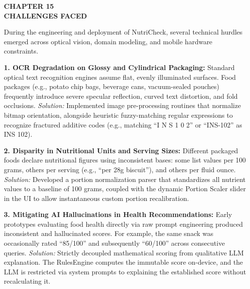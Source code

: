\documentclass[12pt]{article}
\begin{document}
\newpage

\begin{center}
\textbf{\Large CHAPTER 15}\\[0.5cm]
\textbf{\Large CHALLENGES FACED}\\[1cm]
\end{center}

\noindent
During the engineering and deployment of NutriCheck, several technical hurdles emerged across optical vision, domain modeling, and mobile hardware constraints.

\vspace{0.3cm}

\noindent
\textbf{1. OCR Degradation on Glossy and Cylindrical Packaging:}
Standard optical text recognition engines assume flat, evenly illuminated surfaces. Food packages (e.g., potato chip bags, beverage cans, vacuum-sealed pouches) frequently introduce severe specular reflection, curved text distortion, and fold occlusions.
\textit{Solution:} Implemented image pre-processing routines that normalize bitmap orientation, alongside heuristic fuzzy-matching regular expressions to recognize fractured additive codes (e.g., matching ``I N S 1 0 2'' or ``INS-102'' as INS 102).

\vspace{0.3cm}

\noindent
\textbf{2. Disparity in Nutritional Units and Serving Sizes:}
Different packaged foods declare nutritional figures using inconsistent bases: some list values per 100 grams, others per serving (e.g., ``per 28g biscuit''), and others per fluid ounce.
\textit{Solution:} Developed a portion normalization parser that standardizes all nutrient values to a baseline of 100 grams, coupled with the dynamic Portion Scaler slider in the UI to allow instantaneous custom portion recalibration.

\vspace{0.3cm}

\noindent
\textbf{3. Mitigating AI Hallucinations in Health Recommendations:}
Early prototypes evaluating food health directly via raw prompt engineering produced inconsistent and hallucinated scores. For example, the same snack was occasionally rated ``85/100'' and subsequently ``60/100'' across consecutive queries.
\textit{Solution:} Strictly decoupled mathematical scoring from qualitative LLM explanation. The RulesEngine computes the immutable score on-device, and the LLM is restricted via system prompts to explaining the established score without recalculating it.
\end{document}
